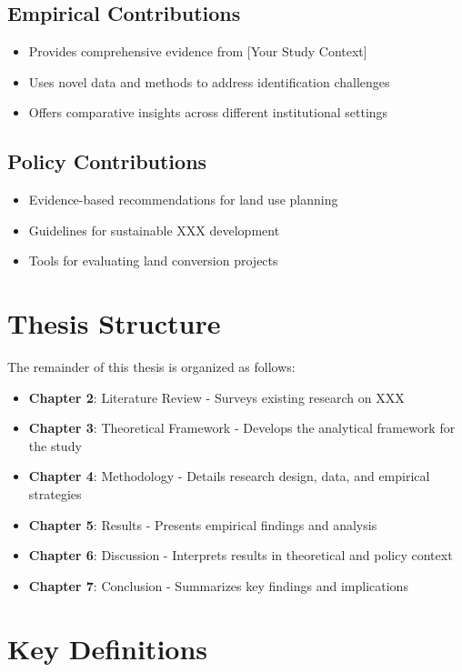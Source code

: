 \subsection{Empirical Contributions}
\begin{itemize}
    \item Provides comprehensive evidence from [Your Study Context]
    \item Uses novel data and methods to address identification challenges
    \item Offers comparative insights across different institutional settings
\end{itemize}

\subsection{Policy Contributions}
\begin{itemize}
    \item Evidence-based recommendations for land use planning
    \item Guidelines for sustainable XXX development
    \item Tools for evaluating land conversion projects
\end{itemize}

\section{Thesis Structure}

The remainder of this thesis is organized as follows:

\begin{itemize}
    \item \textbf{Chapter 2}: Literature Review - Surveys existing research on XXX
    \item \textbf{Chapter 3}: Theoretical Framework - Develops the analytical framework for the study
    \item \textbf{Chapter 4}: Methodology - Details research design, data, and empirical strategies
    \item \textbf{Chapter 5}: Results - Presents empirical findings and analysis
    \item \textbf{Chapter 6}: Discussion - Interprets results in theoretical and policy context
    \item \textbf{Chapter 7}: Conclusion - Summarizes key findings and implications
\end{itemize}

\section{Key Definitions}

